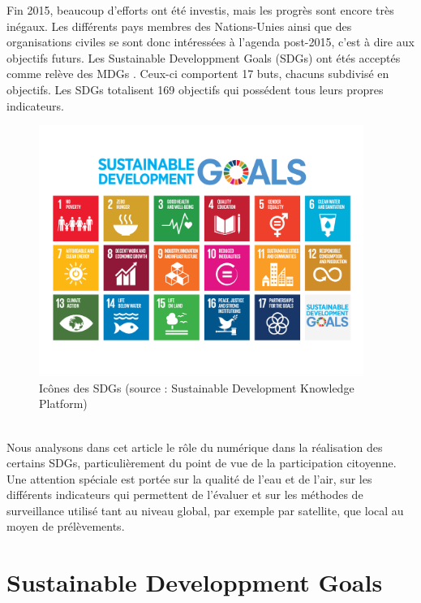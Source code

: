 \documentclass[10pt, conference, compsocconf]{llncs}
\begin{document}
	Fin 2015, beaucoup d'efforts ont été investis, mais les progrès sont encore très inégaux. Les différents pays membres des Nations-Unies ainsi que des organisations civiles se sont donc intéressées à l'agenda post-2015, c'est à dire aux objectifs futurs. Les Sustainable Developpment Goals (SDGs) ont étés acceptés comme relève des MDGs \cite{wikipedia_sustainable_2017}. Ceux-ci comportent 17 buts, chacuns subdivisé en objectifs. Les SDGs totalisent 169 objectifs qui possédent tous leurs propres indicateurs.
	\begin{figure}
		\begin{center}
			\includegraphics[width=300pt]{sdgs.png}
		\end{center}
		\caption{Icônes des SDGs (source : Sustainable Development Knowledge Platform)}
	\end{figure}
	\\
	Nous analysons dans cet article le rôle du numérique dans la réalisation des certains SDGs, particulièrement du point de vue de la participation citoyenne. Une attention spéciale est portée sur la qualité de l'eau et de l'air, sur les différents indicateurs qui permettent de l'évaluer et sur les méthodes de surveillance utilisé tant au niveau global, par exemple par satellite, que local au moyen de prélèvements.

	\section{Sustainable Developpment Goals}
\end{document}
